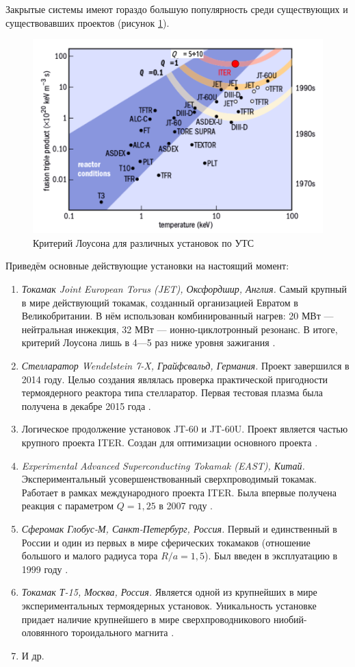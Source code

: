 Закрытые системы имеют гораздо большую популярность среди существующих и существовавших проектов \cite{plasma_nsu} (рисунок \ref{fig:plasma_in_different_places}). 


\begin{figure}[h]
\centering
\includegraphics[width=0.8\linewidth]{./fig/ch1/plasma_in_different_places}
\caption{Критерий Лоусона для различных установок по УТС}
\label{fig:plasma_in_different_places}
\end{figure}


Приведём основные действующие установки на настоящий момент:
\begin{enumerate}
\item \textit{Токамак Joint European Torus (JET), Оксфордшир, Англия.} Самый крупный в мире действующий токамак, созданный организацией Евратом в Великобритании. В нём использован комбинированный нагрев: 20 МВт --- нейтральная инжекция, 32 МВт --- ионно-циклотронный резонанс. В итоге, критерий Лоусона лишь в 4—5 раз ниже уровня зажигания \cite{Kubic2007}.
\item \textit{Стелларатор Wendelstein 7-X, Грайфсвальд, Германия.} Проект завершился в 2014 году. Целью создания являлась проверка практической пригодности термоядерного реактора типа стелларатор. Первая тестовая плазма была получена в декабре 2015 года \cite{Max_plankINST}.
\item {} Логическое продолжение установок JT-60 и JT-60U. Проект является частью крупного проекта ITER. Создан для оптимизации основного проекта \cite{JT-60SA}.
\item \textit{Experimental Advanced Superconducting Tokamak (EAST), Китай.} Экспериментальный усовершенствованный сверхпроводимый токамак. Работает в рамках международного проекта ITER. Была впервые получена реакция с параметром $Q = 1,25$ в 2007 году \cite{wan2009recent}.
\item \textit{Сферомак Глобус-М, Санкт-Петербург, Россия.} Первый и единственный в России и один из первых в мире сферических токамаков (отношение большого и малого радиуса тора $R/a = 1,5$). Был введен в эксплуатацию в 1999 году \cite{globus-m}.
\item \textit{Токамак Т-15, Москва, Россия.} Является одной из крупнейших в мире экспериментальных термоядерных установок. Уникальность установке придает наличие крупнейшего в мире сверхпроводникового ниобий-оловянного тороидального магнита \cite{T15}.
\item И др.
\end{enumerate}

